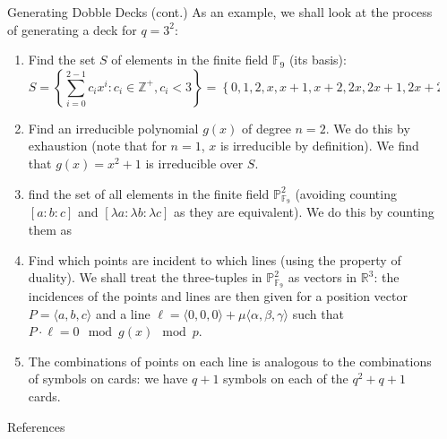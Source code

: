 \documentclass[final]{beamer}
\newlength{\sepwidth}
\newlength{\colwidth}
\newcommand{\separatorcolumn}{\begin{column}{\sepwidth}\end{column}}
\begin{document}
\begin{frame}[t]
\begin{columns}[t]
\begin{column}{\colwidth}
\begin{exampleblock}{Generating Dobble Decks (cont.)}
    As an example, we shall look at the process of generating a deck for $q = 3^2$:

    \begin{enumerate}
        \item Find the set $S$ of elements in the finite field $\mathbb{F}_9$ (its basis):
            \begin{equation*}
                S = \left\{ \sum_{i=0}^{2-1} c_ix^i : c_i \in \mathbb{Z}^+, c_i < 3 \right\} = \left\{ 0, 1, 2, x, x+1, x+2, 2x, 2x+1, 2x+2 \right\}
            \end{equation*}
        \item Find an irreducible polynomial $g(x)$ of degree $n = 2$. We do this by exhaustion (note that for $n=1$, $x$ is irreducible by definition). We find that $g(x) = x^2+1$ is irreducible over $S$.
        \item find the set of all elements in the finite field $\mathbb{P}^2_{\mathbb{F}_9}$ (avoiding counting $[a:b:c]$ and $[\lambda a:\lambda b:\lambda c]$ as they are equivalent). We do this by counting them as

        \begin{center}
            \begin{minipage}{14em}
                
            \end{minipage}
        \end{center}

        \item Find which points are incident to which lines (using the property of duality). We shall treat the three-tuples in $\mathbb{P}^2_{\mathbb{F}_9}$ as vectors in $\mathbb{R}^3$: the incidences of the points and lines are then given for a position vector $P = \langle a,b,c \rangle$ and a line $\ell = \langle 0,0,0 \rangle + \mu \langle \alpha,\beta,\gamma \rangle$ such that $P \cdot \ell = 0 \mod g(x) \mod p$.

        \item The combinations of points on each line is analogous to the combinations of symbols on cards: we have $q+1$ symbols on each of the $q^2+q+1$ cards.
    \end{enumerate}

  \end{exampleblock}

 
  \begin{block}{References}
    \vspace{-0.25em}
\footnotesize{}
  \end{block}

\end{column}

\separatorcolumn
\end{columns}
\end{frame}
\end{document}
